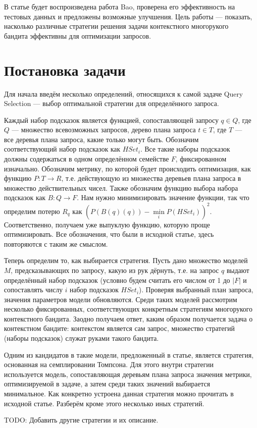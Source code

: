 \documentclass[12pt]{article}
\begin{document}
В статье будет воспроизведена работа Bao, проверена его эффективность на тестовых данных и предложены возможные улучшения. Цель работы — показать, насколько различные стратегии решения задачи контекстного многорукого бандита эффективны для оптимизации запросов.

\section{Постановка задачи}

Для начала введём несколько определений, относящихся к самой задаче Query Selection — выбор оптимальной стратегии для определённого запроса.

Каждый набор подсказок является функцией, сопоставляющей запросу $q \in Q$, где $Q$ — множество всевозможных запросов, дерево плана запроса $t \in T$, где $T$ — все деревья плана запроса, какие только могут быть. Обозначим соответствующий набор подсказок как $HSet_i$. Все такие наборы подсказок должны содержаться в одном определённом семействе $F$, фиксированном изначально. Обозначим метрику, по которой будет происходить оптимизация, как функцию $P : T \xrightarrow{} R$, т.е. действующую из множества деревьев плана запроса в множество действительных чисел. Также обозначим функцию выбора набора подсказок как $B: Q \xrightarrow{} F$. Нам нужно минимизировать значение функции, так что определим потерю $R_q$ как $(P(B(q)(q)) - \min\limits_{i} P(HSet_i))^2$. Соответственно, получаем уже выпуклую функцию, которую проще оптимизировать. Все обозначения, что были в исходной статье, здесь повторяются с таким же смыслом.

Теперь определим то, как выбирается стратегия. Пусть дано множество моделей $M$, предсказывающих по запросу, какую из рук дёрнуть, т.е. на запрос $q$ выдают определённый набор подсказок (условно будем считать его числом от 1 до $|F|$ и сопоставлять числу $i$ набор подсказок $HSet_i$). Проверяя выбранный план запроса, значения параметров модели обновляются. Среди таких моделей рассмотрим несколько фиксированных, соответствующих конкретным стратегиям многорукого контекстного бандита. Заодно получаем ответ, каким образом получается задача о контекстном бандите: контекстом является сам запрос, множество стратегий (наборы подсказок) служат руками такого бандита.

Одним из кандидатов в такие модели, предложенный в статье, является стратегия, основанная на семплировании Томпсона. Для этого внутри стратегии используется модель, сопоставляющая деревьям плана запроса значения метрики, оптимизируемой в задаче, а затем среди таких значений выбирается минимальное. Как конкретно устроена данная стратегия можно прочитать в исходной статье\cite{bao}. Разберём кроме этого несколько иных стратегий.

TODO: Добавить другие стратегии и их описание.



\end{document}
